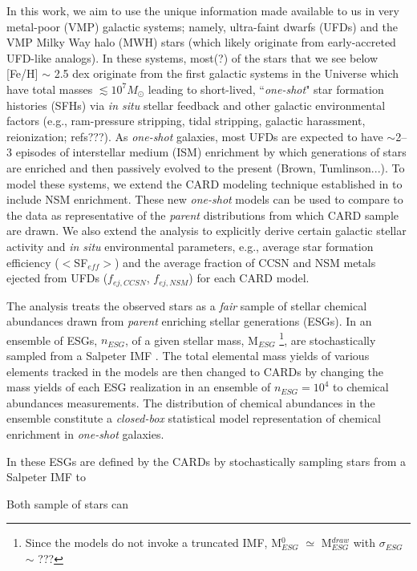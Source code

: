 In this work, we aim to use the unique information made available to us in very metal-poor (VMP) galactic systems; namely, ultra-faint dwarfs (UFDs) and the VMP Milky Way halo (MWH) stars (which likely originate from early-accreted UFD-like analogs). In these systems, most(?) of the stars that we see below [Fe/H] $\sim$ 2.5 dex originate from the first galactic systems in the Universe which have total masses $\lesssim10^7 M_\odot$ leading to short-lived, ``{\it one-shot}" star formation histories (SFHs) via {\it in situ} stellar feedback and other galactic environmental factors (e.g., ram-pressure stripping, tidal stripping, galactic harassment, reionization; refs???). As {\it one-shot} galaxies, most UFDs are expected to have $\sim$2--3 episodes of interstellar medium (ISM) enrichment by which generations of stars are enriched and then passively evolved to the present (Brown, Tumlinson...). To model these systems, we extend the CARD modeling technique established in \cite{Lee_2013} to include NSM enrichment. These new {\it one-shot} models can be used to compare to the data as representative of the {\it parent} distributions from which CARD sample are drawn. We also extend the \cite{Lee_2013} analysis to explicitly derive certain galactic stellar activity and {\it in situ} environmental parameters, e.g., average star formation efficiency ($<$SF$_{eff}>$) and the average fraction of CCSN and NSM metals ejected from UFDs ($f_{ej,CCSN}$, $f_{ej,NSM}$) for each CARD model.


The analysis treats the observed stars as a {\it fair} sample of stellar chemical abundances drawn from {\it parent} enriching stellar generations (ESGs). In \cite{Lee_2013} an ensemble of ESGs, $n_{ESG}$, of a given stellar mass, M$_{ESG}$
\footnote{Since the models do not invoke a truncated IMF, M$_{ESG}^0$ $\simeq$ M$_{ESG}^{draw}$ with $\sigma_{ESG}$ $\sim$ ???}, 
are stochastically sampled from a Salpeter IMF \citep{Salpeter_1955}. The total elemental mass yields of various elements tracked in the models are then changed to CARDs by changing the mass yields of each ESG realization in an ensemble of $n_{ESG} = 10^4$ to chemical abundances measurements. The distribution of chemical abundances in the ensemble constitute a {\it closed-box} statistical model representation of chemical enrichment in {\it one-shot} galaxies. 


In \cite{Lee_2013} these ESGs are defined by the CARDs by stochastically sampling stars from a Salpeter IMF \citep{Salpeter_1955} to    

Both sample of stars can 